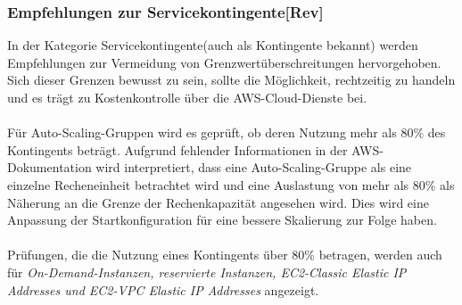 \subsubsection*{Empfehlungen zur Servicekontingente[Rev]}
In der Kategorie Servicekontingente(auch als Kontingente bekannt) werden Empfehlungen zur Vermeidung von Grenzwertüberschreitungen hervorgehoben. Sich dieser Grenzen bewusst zu sein, sollte die Möglichkeit, rechtzeitig zu handeln und es trägt zu Kostenkontrolle über die AWS-Cloud-Dienste bei.
\\\\
Für Auto-Scaling-Gruppen %
wird es geprüft, ob deren Nutzung mehr als 80\% des Kontingents beträgt. Aufgrund fehlender Informationen in der AWS-Dokumentation wird interpretiert, dass eine Auto-Scaling-Gruppe als eine einzelne Recheneinheit betrachtet wird und eine Auslastung von mehr als 80\% als Näherung an die Grenze der Rechenkapazität angesehen wird.
Dies wird eine Anpassung der Startkonfiguration für eine bessere Skalierung zur Folge haben. %
\\\\
Prüfungen, die die Nutzung eines Kontingents über 80\% betragen, werden auch für \textit{On-Demand-Instanzen, reservierte Instanzen, EC2-Classic Elastic IP Addresses und EC2-VPC Elastic IP Addresses} angezeigt.

